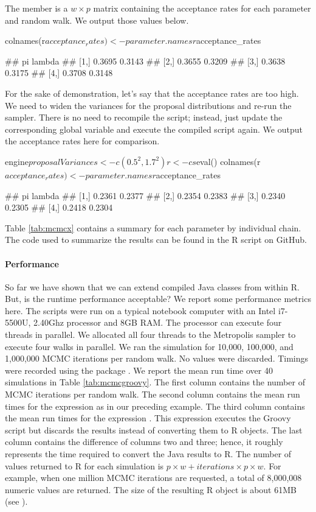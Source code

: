 The  member is a $w \times p$ matrix containing the acceptance rates for each parameter and random walk. We output those values below.

\begin{example}
colnames(r$acceptance_rates) <- parameter.names
r$acceptance_rates

##          pi lambda
## [1,] 0.3695 0.3143
## [2,] 0.3655 0.3209
## [3,] 0.3638 0.3175
## [4,] 0.3708 0.3148
\end{example}

For the sake of demonstration, let's say that the acceptance rates are too high. We need to widen the variances for the proposal distributions and re-run the sampler. There is no need to recompile the script; instead, just update the corresponding global variable and execute the compiled script again. We output the acceptance rates here for comparison.

\begin{example}
engine$proposalVariances <- c(0.5^2, 1.7^2)
r <- cs$eval()
colnames(r$acceptance_rates) <- parameter.names
r$acceptance_rates

##          pi lambda
## [1,] 0.2361 0.2377
## [2,] 0.2354 0.2383
## [3,] 0.2340 0.2305
## [4,] 0.2418 0.2304
\end{example}

Table \ref{tab:mcmcx} contains a summary for each parameter by individual chain. The code used to summarize the results can be found in the R script  on GitHub.

\paragraph{Performance} So far we have shown that we can extend compiled Java classes from within R. But, is the runtime performance acceptable? We report some performance metrics here. The scripts were run on a typical notebook computer with an Intel i7-5500U, 2.40Ghz processor and 8GB RAM. The processor can execute four threads in parallel. We allocated all four threads to the Metropolis sampler to execute four walks in parallel. We ran the simulation for 10,000, 100,000, and 1,000,000 MCMC iterations per random walk. No values were discarded. Timings were recorded using the  package \citep{microbenchmark}. We report the mean run time over 40 simulations in Table \ref{tab:mcmcgroovy}. The first column contains the number of MCMC iterations per random walk. The second column contains the mean run times for the expression  as in our preceding example. The third column contains the mean run times for the expression . This expression executes the Groovy script but discards the results instead of converting them to R objects. The last column contains the difference of columns two and three; hence, it roughly represents the time required to convert the Java results to R. The number of values returned to R for each simulation is $p \times w + iterations \times p \times w$. For example, when one million MCMC iterations are requested, a total of 8,000,008 numeric values are returned. The size of the resulting R object is about 61MB (see ).

